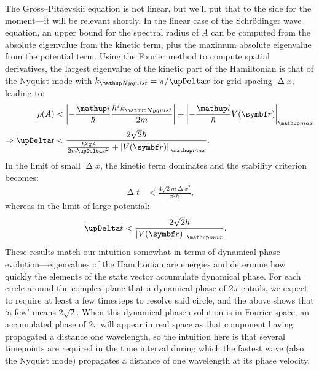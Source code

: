 The Gross--Pitaevskii equation is not linear, but we'll put that to the side for the moment---it will be relevant shortly. In the linear case of the Schr\"odinger wave equation, an upper bound for the spectral radius of $A$ can be computed from the absolute eigenvalue from the kinetic term, plus the maximum absolute eigenvalue from the potential term. Using the Fourier method to compute spatial derivatives, the largest eigenvalue of the kinetic part of the Hamiltonian is that of the Nyquist mode with $k_\up{Nyquist} = \pi / \upDelta x$ for grid spacing $\upDelta x$, leading to:
\begin{align}
\rho(A) &< \Abs{-\frac \ii \hbar \frac{\hbar^2 k_\up{Nyquist}}{2m}}
+ \Abs{-\frac \ii \hbar V(\vec r)}_\up{max}\\
\Rightarrow \upDelta t &< \frac{2\sqrt 2 \hbar}
{\frac{\hbar^2\pi^2}{2m \upDelta x^2} + \abs{V(\vec r)}_\up{max}}.
\end{align}
In the limit of small $\upDelta x$, the kinetic term dominates and the stability criterion becomes:
\begin{align}\label{eq:rk4_kinetic_stability}
\upDelta t &< \frac{4\sqrt 2 m \upDelta x^2}{\pi^2 \hbar},
\end{align}
whereas in the limit of large potential:
\begin{align}
\upDelta t &< \frac{2\sqrt 2\hbar}{\abs{V(\vec r)}_\up{max}}.
\end{align}
These results match our intuition somewhat in terms of dynamical phase evolution---eigenvalues of the Hamiltonian are energies and determine how quickly the elements of the state vector accumulate dynamical phase. For each circle around the complex plane that a dynamical phase of $2\pi$ entails, we expect to require at least a few timesteps to resolve said circle, and the above shows that `a few' means $2\sqrt{2}$. When this dynamical phase evolution is in Fourier space, an accumulated phase of $2\pi$ will appear in real space as that component having propagated a distance one wavelength, so the intuition here is that several timepoints are required in the time interval during which the fastest wave (also the Nyquist mode) propagates a distance of one wavelength at its phase velocity.

